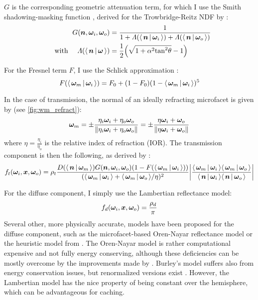 $G$ is the corresponding geometric attenuation term, for which I use the Smith shadowing-masking function \parencite{smith1967}, derived for the Trowbridge-Reitz NDF by \textcite{walter2007}:
\begin{equation}
    \begin{aligned}
    G(\n, \wi, \wo) &= \frac{1}{1 + \Lambda(\NdotL) + \Lambda(\NdotV)}\\
    \quad \text{with } \quad
    \Lambda(\NdotX) &= \frac{1}{2} \left( \sqrt{1 + \alpha^2 \mathrm{tan}^2 \theta} - 1 \right)
    \end{aligned}
\end{equation}

For the Fresnel term $F$, I use the Schlick approximation \parencite{schlick1994}:
\begin{equation}
    F(\LdotH) = F_0 + (1 - F_0) (1 - \LdotH)^5
\end{equation}

In the case of transmission, the normal of an ideally refracting microfacet is given by (see \autoref{fig:wm_refract}):
\begin{equation}
    \bm{\omega}_m = \pm\frac{\eta_i {\bm{\omega}_i} + \eta_o {\bm{\omega}_o}}{\|\eta_i {\bm{\omega}_i} + \eta_o {\bm{\omega}_o}\|} = \pm\frac{\eta {\bm{\omega}_i} + {\bm{\omega}_o}}{\|\eta {\bm{\omega}_i} + {\bm{\omega}_o}\|}
\end{equation}
where $\eta = \frac{\eta_i}{\eta_o}$ is the relative index of refraction (IOR).
The transmission component is then the following, as derived by \textcite{walter2007}:
\begin{equation}
    f_t(\wi, \vec{x}, \wo) = \rho_t \frac{D(\NdotH) G(\n, \wi, \wo) (1 - F(\LdotH))}{(\LdotH + \VdotH / \eta)^2} \left|\frac{\LdotH \VdotH}{\NdotL \NdotV}\right|
\end{equation}

For the diffuse component, I simply use the Lambertian reflectance model:
\begin{equation}
    f_d({\bm{\omega}_i}, \bm{x}, {\bm{\omega}_o}) = \frac{\rho_d}{\pi}
\end{equation}
Several other, more physically accurate, models have been proposed for the diffuse component, such as the microfacet-based Oren-Nayar reflectance model \parencite{oren1994} or the heuristic model from \textcite{burley2012}.
The Oren-Nayar model is rather computational expensive and not fully energy conserving, although these deficiencies can be mostly overcome by the improvements made by \textcite{fujii}.
Burley's model suffers also from energy conservation issues, but renormalized versions exist \parencite{lagarde2014}.
However, the Lambertian model has the nice property of being constant over the hemisphere, which can be advantageous for caching.

